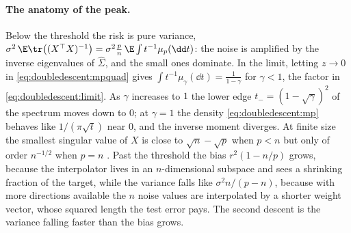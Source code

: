 \begin{refsection}
\paragraph{The anatomy of the peak.} Below the threshold the risk is pure variance, $\sigma^2\,\E\tr\bigl((X^\top X)^{-1}\bigr)=\sigma^2\frac pn\,\E\int t^{-1}\mu_p(\dd t)$: the noise is amplified by the inverse eigenvalues of $\hat\Sigma$, and the small ones dominate. In the limit, letting $z\to0$ in \eqref{eq:doubledescent:mpquad} gives $\int t^{-1}\mu_\gamma(\dd t)=\frac1{1-\gamma}$ for $\gamma<1$, the factor in \eqref{eq:doubledescent:limit}. As $\gamma$ increases to $1$ the lower edge $t_-=(1-\sqrt\gamma)^2$ of the spectrum moves down to $0$; at $\gamma=1$ the density \eqref{eq:doubledescent:mp} behaves like $1/(\pi\sqrt t)$ near $0$, and the inverse moment diverges. At finite size the smallest singular value of $X$ is close to $\sqrt n-\sqrt p$ when $p<n$ \parencite{Silverstein1985} but only of order $n^{-1/2}$ when $p=n$ \parencite{Edelman1988}. Past the threshold the bias $r^2(1-n/p)$ grows, because the interpolator lives in an $n$-dimensional subspace and sees a shrinking fraction of the target, while the variance falls like $\sigma^2n/(p-n)$, because with more directions available the $n$ noise values are interpolated by a shorter weight vector, whose squared length the test error pays. The second descent is the variance falling faster than the bias grows.


\end{refsection}
